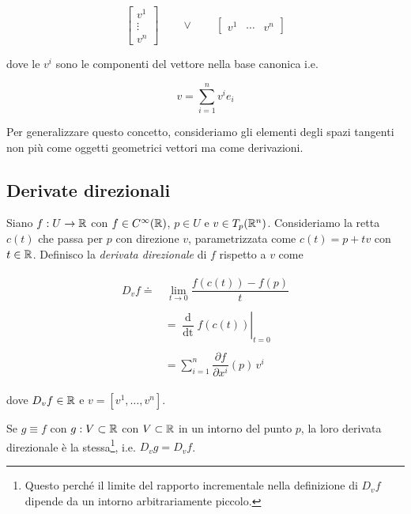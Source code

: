 \begin{equation}
	\begin{bmatrix} v^{1} \\ \vdots \\ v^{n} \end{bmatrix} \qquad \lor \qquad \begin{bmatrix} v^{1} & \cdots & v^{n} \end{bmatrix}
\end{equation}

dove le $ v^{i} $ sono le componenti del vettore nella base canonica i.e.

\begin{equation}
	v = \sum_{i=1}^{n} v^{i} e_{i}
\end{equation}

Per generalizzare questo concetto, consideriamo gli elementi degli spazi tangenti non più come oggetti geometrici vettori ma come derivazioni.

\subsection{Derivate direzionali}

Siano $ f : U \to \mathbb{R} $ con $ f \in C^{\infty}(\mathbb{R}) $, $ p\in U $ e $ v \in T_{p}(\mathbb{R}^{n}) $. Consideriamo la retta $ c(t) $ che passa per $ p $ con direzione $ v $, parametrizzata come $ c(t)=p+tv $ con $ t \in \mathbb{R} $. Definisco la \textit{derivata direzionale} di $ f $ rispetto a $ v $ come

\begin{align}
	\begin{split}
		D_{v} f \doteq& \, \lim_{t \to 0} \dfrac{f(c(t)) - f(p)}{t}\\\\
		&= \left. \dfrac{\operatorname{d}}{\operatorname{dt}} f(c(t)) \right|_{t=0}\\\\
		&= \sum_{i=1}^{n} \dfrac{\partial f}{\partial x^{i}} (p) \, v^{i}
	\end{split}
\end{align}

dove $ D_{v} f \in \mathbb{R} $ e $ v = [v^{1},\dots,v^{n}] $.

\begin{remark}
	Se $ g \equiv f $ con $ g : V \subset \mathbb{R} $ con $ V \subset \mathbb{R} $ in un intorno del punto $ p $, la loro derivata direzionale è la stessa\footnote{%
		Questo perché il limite del rapporto incrementale nella definizione di $ D_{v} f $ dipende da un intorno arbitrariamente piccolo.%
	}, i.e. $ D_{v} g = D_{v} f $.
\end{remark}

